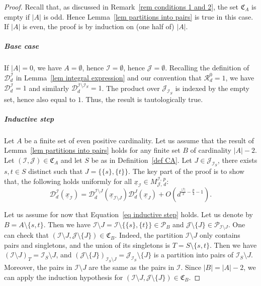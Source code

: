 \documentclass[AHL,Unicode,longabstracts,published]{cedram}
\newcommand{\D}{\mathcal{D}}
\newcommand{\I}{\mathcal{I}}
\newcommand{\J}{\mathcal{J}}
\newcommand{\clR}{\mathcal{R}}
\newcommand{\frkC}{\mathfrak{C}}
\newcommand{\pa}{\mathcal{P}\!}
\newcommand{\norm}[1]{\left\lvert #1 \right\rvert}
\begin{document}
\begin{proof}
Recall that, as discussed in Remark~\ref{rem conditions 1 and 2}, the set $\frkC_A$ is empty if $|A|$ is odd. Hence Lemma~\ref{lem partitions into pairs} is true in this case. If $|A|$ is even, the proof is by induction on (one half of) $|A|$.

\subparagraph*{Base case}
If $|A|=0$, we have $A = \emptyset$, hence $\I = \emptyset$, hence $\J = \emptyset$. Recalling the definition of $\D^\I_d$ in Lemma~\ref{lem integral expression} and our convention that $\clR_d^0=1$, we have $\D^\I_d =1$ and similarly $\D^{\I\setminus \I_S}_d =1$. The product over $\J_{\I_S}$ is indexed by the empty set, hence also equal to $1$. Thus, the result is tautologically true.

\subparagraph*{Inductive step}
Let $A$ be a finite set of even positive cardinality. Let us assume that the result of Lemma~\ref{lem partitions into pairs} holds for any finite set $B$ of cardinality $|A|-2$. Let $(\I,\J) \in \frkC_A$ and let $S$ be as in Definition~\ref{def CA}. Let $J \in \J_{\I_S}$, there exists $s,t \in S$ distinct such that $J =\{\{s\},\{t\}\}$. The key part of the proof is to show that, the following holds uniformly for all $\underline{x}_\I \in M^{\I,\,p}_{\J,\,d}$:
\begin{equation}\label{eq inductive step}
\D^\I_d\left(\underline{x}_\I\right) = \D_d^{\I \setminus J}\left(\underline{x}_{\I \setminus J}\right)\D_d^J\left(\underline{x}_J\right) +O\left(d^{\frac{\norm{\I}}{2}-\frac{p}{4}-1}\right).
\end{equation}

Let us assume for now that Equation~\eqref{eq inductive step} holds. Let us denote by $B = A \setminus \{s,t\}$. Then we have $\I \setminus J = \I \setminus \{\{s\},\{t\}\} \in \pa_B$ and $\J \setminus \{J\} \in \pa_{\I \setminus J}$. One can check that $(\I \setminus J, \J \setminus \{J\}) \in \frkC_B$. Indeed, the partition $\I \setminus J$ only contains pairs and singletons, and the union of its singletons is $T = S \setminus \{s,t\}$. Then we have $(\I \setminus J)_T = \I_S \setminus J$, and $(\J \setminus \{J\})_{\I_S \setminus J} = \J_{\I_S} \setminus \{J\}$ is a partition into pairs of $\I_S \setminus J$. Moreover, the pairs in $\I \setminus J$ are the same as the pairs in $\I$. Since $|B| = |A|-2$, we can apply the induction hypothesis for $(\I \setminus J, \J \setminus \{J\}) \in \frkC_B$.


\end{proof}
\end{document}
